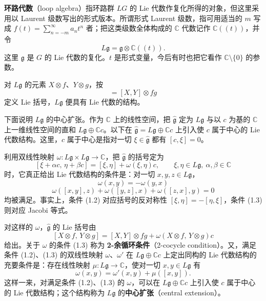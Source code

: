 \textbf{环路代数}（loop algebra）指环路群 $LG$ 的 Lie 代数作复化所得的对象，但这里采用以 Laurent 级数写出的形式版本。所谓形式 Laurent 级数，指可用适当的 $m$ 写成 $f(t)=\sum_{n=-m}^{\infty}a_{n}t^{n}$ 者；把这类级数全体构成的 $\mathbb{C}$ 代数记作 $\mathbb{C}((t))$，并令
\[
  L\mathfrak{g}=\mathfrak{g}\otimes\mathbb{C}((t)).
\]
这里 $\mathfrak{g}$ 是 $G$ 的 Lie 代数的复化。$t$ 是形式变量，今后有时也把它看作 $\mathbb{C}\setminus\{0\}$ 的参数。

对 $L\mathfrak{g}$ 的元素 $X\otimes f$、$Y\otimes g$，按
\begin{equation}
  [X\otimes f,\,Y\otimes g]=[X,Y]\otimes fg \tag{1.1}
\end{equation}
定义 Lie 括号，$L\mathfrak{g}$ 便具有 Lie 代数的结构。

下面说明 $L\mathfrak{g}$ 的中心扩张。作为 $\mathbb{C}$ 上的线性空间，把 $\widehat{\mathfrak{g}}$ 定为 $L\mathfrak{g}$ 与以 $c$ 为基的 $\mathbb{C}$ 上一维线性空间的直和 $L\mathfrak{g}\oplus\mathbb{C}c$。以下在 $\widehat{\mathfrak{g}}=L\mathfrak{g}\oplus\mathbb{C}c$ 上引入使 $c$ 属于中心的 Lie 代数结构。这里，$c$ 属于中心是指对一切 $\xi\in\widehat{\mathfrak{g}}$ 都有 $[c,\xi]=0$。

利用双线性映射 $\omega\colon L\mathfrak{g}\times L\mathfrak{g}\to\mathbb{C}$，把 $\widehat{\mathfrak{g}}$ 的括号定为
\[
  [\xi+\alpha c,\,\eta+\beta c]=[\xi,\eta]+\omega(\xi,\eta)c,
  \qquad \xi,\eta\in L\mathfrak{g},\ \alpha,\beta\in\mathbb{C}
\]
时，它真正给出 Lie 代数结构的条件是：对一切 $x,y,z\in L\mathfrak{g}$，
\begin{equation}
  \omega(x,y)=-\omega(y,x) \tag{1.2}
\end{equation}
\begin{equation}
  \omega([x,y],z)+\omega([y,z],x)+\omega([z,x],y)=0 \tag{1.3}
\end{equation}
均被满足。事实上，条件 (1.2) 对应括号的反对称性 $[\xi,\eta]=-[\eta,\xi]$，条件 (1.3) 则对应 Jacobi 等式。

对这样的 $\omega$，$\widehat{\mathfrak{g}}$ 的 Lie 括号由
\[
  [X\otimes f,\,Y\otimes g]=[X,Y]\otimes fg+\omega(X\otimes f,\,Y\otimes g)c
\]
给出。关于 $\omega$ 的条件 (1.3) 称为 \textbf{2-余循环条件}（2-cocycle condition）。又，满足条件 (1.2)、(1.3) 的双线性映射 $\omega$、$\omega'$ 在 $L\mathfrak{g}\oplus\mathbb{C}c$ 上定出同构的 Lie 代数结构的充要条件是：存在线性映射 $\mu\colon L\mathfrak{g}\to\mathbb{C}$，使对一切 $x,y\in L\mathfrak{g}$ 有
\[
  \omega(x,y)=\omega'(x,y)+\mu([x,y]).
\]
这样一来，对满足条件 (1.2)、(1.3) 的 $\omega$，可以在 $L\mathfrak{g}\oplus\mathbb{C}c$ 上引入使 $c$ 属于中心的 Lie 代数结构；这个结构称为 $L\mathfrak{g}$ 的\textbf{中心扩张}（central extension）。

